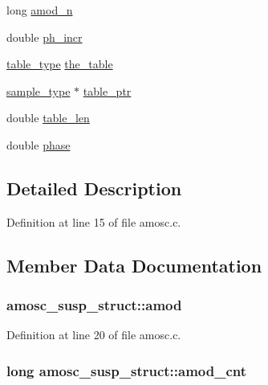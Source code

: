 \begin{DoxyCompactItemize}
\item 
long \hyperlink{structamosc__susp__struct_ae360e13798869a359e9d567d5eda4c62}{amod\+\_\+n}
\item 
double \hyperlink{structamosc__susp__struct_aae2b6b568712656dab8f7b8d16b7485a}{ph\+\_\+incr}
\item 
\hyperlink{sound_8h_a187b856587310160cfd8b383e7377171}{table\+\_\+type} \hyperlink{structamosc__susp__struct_ae267d43e76ae0ec2f4e188e91e218c73}{the\+\_\+table}
\item 
\hyperlink{sound_8h_a3a9d1d4a1c153390d2401a6e9f71b32c}{sample\+\_\+type} $\ast$ \hyperlink{structamosc__susp__struct_a6444ca2d19cc228b6314dd10e3e78642}{table\+\_\+ptr}
\item 
double \hyperlink{structamosc__susp__struct_a0d368aa9d9cbce3f1d066342355bdd08}{table\+\_\+len}
\item 
double \hyperlink{structamosc__susp__struct_a650216b1005a0af1b4b4fcb57a63ac55}{phase}
\end{DoxyCompactItemize}


\subsection{Detailed Description}


Definition at line 15 of file amosc.\+c.



\subsection{Member Data Documentation}
\subsubsection[{\texorpdfstring{amod}{amod}}]{ amosc\+\_\+susp\+\_\+struct\+::amod}\hypertarget{structamosc__susp__struct_ad59c4900abd378adfee078e9b9da733e}{}\label{structamosc__susp__struct_ad59c4900abd378adfee078e9b9da733e}


Definition at line 20 of file amosc.\+c.

\subsubsection[{\texorpdfstring{amod\+\_\+cnt}{amod_cnt}}]{\setlength{\rightskip}{0pt plus 5cm}long amosc\+\_\+susp\+\_\+struct\+::amod\+\_\+cnt}\hypertarget{structamosc__susp__struct_a6ebfab5d7cb287783e4c08b42b437c99}{}\label{structamosc__susp__struct_a6ebfab5d7cb287783e4c08b42b437c99}


